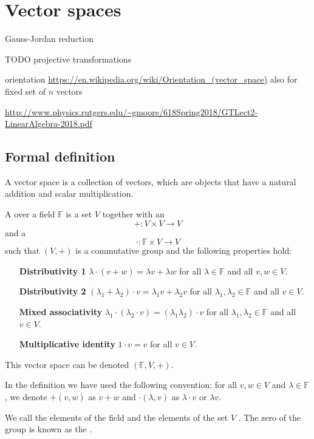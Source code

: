 \chapter{Vector spaces}

Gauss-Jordan reduction

TODO projective transformations

orientation
\url{https://en.wikipedia.org/wiki/Orientation_(vector_space)}
also for fixed set of $n$ vectors

\url{http://www.physics.rutgers.edu/~gmoore/618Spring2018/GTLect2-LinearAlgebra-2018.pdf}

\section{Formal definition}
A vector space is a collection of vectors, which are objects that have a natural addition and scalar multiplication.
\begin{definition}
A  over a field $\mathbb{F}$ is a set $V$ together with an 
\[ +: V\times V \to V \]
and a 
\[ \cdot: \mathbb{F}\times V \to V \]
such that $(V,+)$ is a commutative group and the following properties hold:
\begin{itemize}[leftmargin=4cm]
\item[\textbf{Distributivity 1}] $\lambda\cdot(v+w) = \lambda v + \lambda w$ for all $\lambda \in \mathbb{F}$ and all $v,w \in V$.
\item[\textbf{Distributivity 2}] $(\lambda_1+\lambda_2)\cdot v = \lambda_1 v + \lambda_2 v$ for all $\lambda_1, \lambda_2 \in \mathbb{F}$ and all $v \in V$.
\item[\textbf{Mixed associativity}] $\lambda_1\cdot(\lambda_2\cdot v) = (\lambda_1 \lambda_2) \cdot v$ for all $\lambda_1, \lambda_2 \in \mathbb{F}$ and all $v \in V$.
\item[\textbf{Multiplicative identity}] $1\cdot v = v$ for all $v \in V$.
\end{itemize}
This vector space can be denoted $(\mathbb{F}, V, +)$.
\end{definition}
In the definition we have used the following convention: for all $v,w\in V$ and $\lambda\in \mathbb{F}$, we denote $+(v,w)$ as $v+w$ and $\cdot(\lambda, v)$ as $\lambda \cdot v$ or $\lambda v$.

We call the elements of the field  and the elements of the set $V$ . The zero of the group is known as the .

